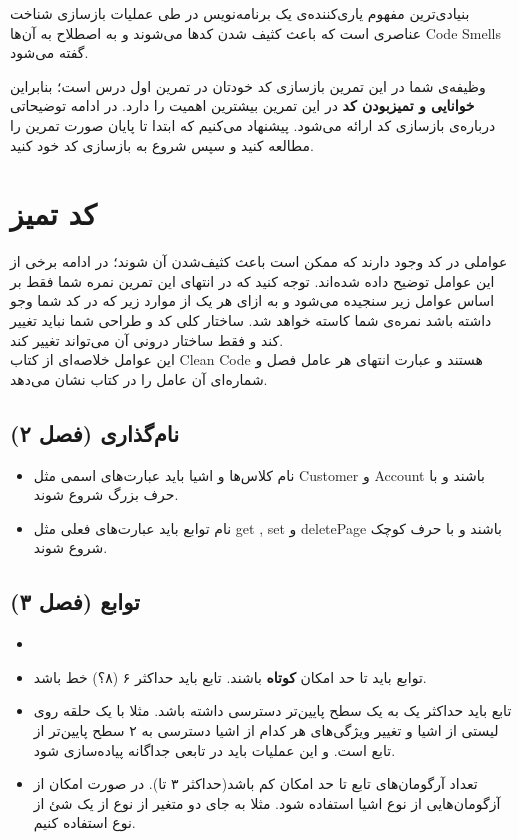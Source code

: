 \documentclass{utap}
\begin{document}
بنیادی‌ترین مفهوم یاری‌کننده‌ی یک برنامه‌نویس در طی عملیات بازسازی شناخت عناصری است که باعث کثیف شدن کدها می‌شوند و به اصطلاح به آن‌ها Code Smells گفته می‌شود.

وظیفه‌ی شما در این تمرین بازسازی کد خودتان در تمرین اول درس است؛ بنابراین \textbf{خوانایی و تمیزبودن کد} در این تمرین بیشترین اهمیت را دارد. در ادامه توضیحاتی درباره‌ی بازسازی کد اراﺋﻪ می‌شود. پیشنهاد می‌کنیم که ابتدا تا پایان صورت تمرین را مطالعه کنید و سپس شروع به بازسازی کد خود کنید.
\newpage
\section{کد تمیز}
عواملی در کد وجود دارند که ممکن است باعث کثیف‌شدن آن شوند؛ در ادامه برخی از این عوامل توضیح داده شده‌اند. توجه کنید که در انتهای این تمرین نمره شما فقط بر اساس عوامل زیر سنجیده می‌شود و به ازای هر یک از موارد زیر که در کد شما وجو داشته باشد نمره‌ی شما کاسته خواهد شد. ساختار کلی کد و طراحی شما نباید تغییر کند و فقط ساختار درونی آن می‌تواند تغییر کند.\\
این عوامل خلاصه‌ای از کتاب Clean Code هستند و عبارت انتهای هر عامل فصل و شماره‌ای آن عامل را در کتاب نشان می‌دهد.

\subsection{نام‌گذاری (فصل ۲)}
  \begin{itemize}
        \item
نام کلاس‌ها و اشیا باید عبارت‌های اسمی مثل Customer و Account باشند و با حرف بزرگ شروع شوند.
	\item
نام توابع باید عبارت‌های فعلی مثل get , set و deletePage باشند و با حرف کوچک شروع شوند.
    \end{itemize}

\subsection{توابع (فصل ۳)}
  \begin{itemize}
	\item
        \item 
توابع باید تا حد امکان \textbf{کوتاه} باشند.
تابع باید حداکثر ۶ (۸‌؟) خط باشد.
	\item
تابع باید حداکثر یک به یک سطح پایین‌تر دسترسی داشته باشد. مثلا با یک حلقه روی لیستی از اشیا و تغییر ویژگی‌های هر کدام از اشیا دسترسی به ۲ سطح پایین‌تر از تابع است. و این عملیات باید در تابعی جداگانه پیاده‌سازی شود.
	\item
تعداد آرگومان‌های تابع تا حد امکان کم باشد(حداکثر ۳ تا). در صورت امکان از آزگومان‌هایی از نوع اشیا استفاده شود. مثلا به جای دو متغیر از نوع  از یک شئ از نوع   استفاده کنیم.
    \end{itemize}
\end{document}
